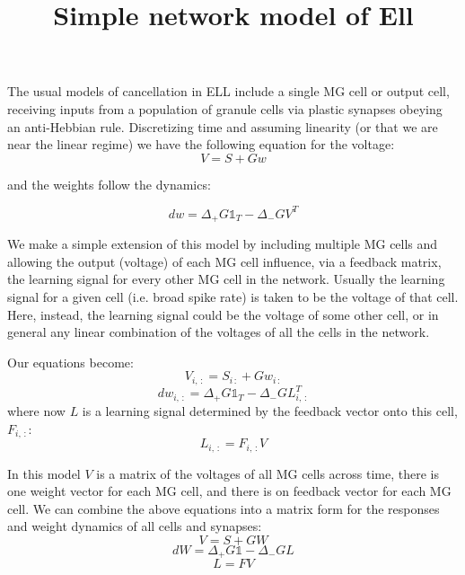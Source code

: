 \documentclass[11pt]{article}
\begin{document}
\title{Simple network model of Ell}


The usual models of cancellation in ELL include a single MG cell or output cell, receiving inputs from a population of granule cells via plastic synapses obeying an anti-Hebbian rule.
Discretizing time and assuming linearity (or that we are near the linear regime) we have the following equation for the voltage:
\begin{equation}
	V = S + Gw
\end{equation}

and the weights follow the dynamics:

\begin{equation}
	dw= \Delta_{+} G\mathbb{1}_T - \Delta_{-} GV^{T}
\end{equation}

We make a simple extension of this model by including multiple MG cells and allowing the output (voltage) of each MG cell influence, via a feedback matrix, the learning signal for every other MG cell in the network. Usually the learning signal for a given cell (i.e. broad spike rate) is taken to be the voltage of that cell. Here, instead, the learning signal could be the voltage of some other cell, or in general any linear combination of the voltages of all the cells in the network. 

Our equations become:
\begin{equation}
	V_{i,\,:} = S_{i\,:} + Gw_{i\,:}
\end{equation}
\begin{equation}
	dw_{i,\,:} = \Delta_{+} G\mathbb{1}_T - \Delta_{-} GL_{i,\,:}^{T}
\end{equation}
where now $L$ is a learning signal determined by the feedback vector onto this cell, $F_{i,\,:}$:
\begin{equation}
	L_{i,\,:} = F_{i,\,:}V
\end{equation}

In this model $V$ is a matrix of the voltages of all MG cells across time, there is one weight vector for each MG cell, and there is on feedback vector for each MG cell. We can combine the above equations into a matrix form for the responses and weight dynamics of all cells and synapses:
\begin{equation}
		V = S + GW
\end{equation}
\begin{equation}
	dW = \Delta_{+} G\mathbb{1} - \Delta_{-} GL
\end{equation}
\begin{equation}
	L = FV
\end{equation}
\end{document}
